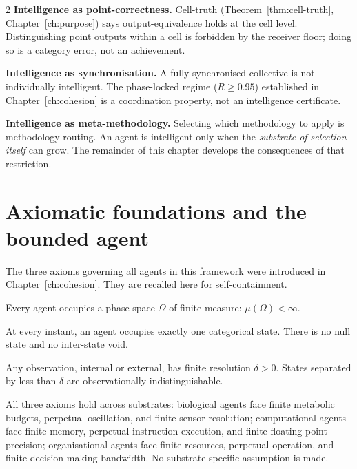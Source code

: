 \begin{multicols}{2}
\textbf{Intelligence as point-correctness.} Cell-truth (Theorem~\ref{thm:cell-truth},
Chapter~\ref{ch:purpose}) says output-equivalence holds at the cell level. Distinguishing
point outputs within a cell is forbidden by the receiver floor; doing so is a category
error, not an achievement.

\textbf{Intelligence as synchronisation.} A fully synchronised collective is not
individually intelligent. The phase-locked regime ($R \ge 0.95$) established in
Chapter~\ref{ch:cohesion} is a coordination property, not an intelligence certificate.

\textbf{Intelligence as meta-methodology.} Selecting which methodology to apply is
methodology-routing. An agent is intelligent only when the \emph{substrate of selection
itself} can grow. The remainder of this chapter develops the consequences of that
restriction.

\section{Axiomatic foundations and the bounded agent}
\label{sec:ch05-axioms}

The three axioms governing all agents in this framework were introduced in
Chapter~\ref{ch:cohesion}. They are recalled here for self-containment.

\begin{axiom}\label{ax:ch05-bounded}
Every agent occupies a phase space $\Omega$ of finite measure: $\mu(\Omega) < \infty$.
\end{axiom}

\begin{axiom}\label{ax:ch05-null}
At every instant, an agent occupies exactly one categorical state. There is no null
state and no inter-state void.
\end{axiom}

\begin{axiom}\label{ax:ch05-resolution}
Any observation, internal or external, has finite resolution $\delta > 0$. States
separated by less than $\delta$ are observationally indistinguishable.
\end{axiom}

\begin{remark}
All three axioms hold across substrates: biological agents face finite metabolic budgets,
perpetual oscillation, and finite sensor resolution; computational agents face finite
memory, perpetual instruction execution, and finite floating-point precision;
organisational agents face finite resources, perpetual operation, and finite
decision-making bandwidth. No substrate-specific assumption is made.
\end{remark}


\end{multicols}
